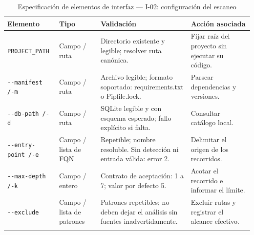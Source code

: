 \begin{table}[H]
\centering\small{}
\caption{Especificación de elementos de interfaz --- I-02: configuración del escaneo}
\begin{tabularx}{\textwidth}{P{3.0cm}P{2.3cm}YY}
\toprule
\textbf{Elemento} & \textbf{Tipo} & \textbf{Validación} & \textbf{Acción asociada} \\
\midrule
\texttt{PROJECT\_\allowbreak PATH} & Campo / ruta & Directorio existente y legible; resolver ruta canónica. & Fijar raíz del proyecto sin ejecutar su código. \\
\addlinespace
\texttt{-\allowbreak -\allowbreak manifest /\allowbreak  -\allowbreak m} & Campo / ruta & Archivo legible; formato soportado: requirements.txt o Pipfile.lock. & Parsear dependencias y versiones. \\
\addlinespace
\texttt{-\allowbreak -\allowbreak db-\allowbreak path /\allowbreak  -\allowbreak d} & Campo / ruta & SQLite legible y con esquema esperado; fallo explícito si falta. & Consultar catálogo local. \\
\addlinespace
\texttt{-\allowbreak -\allowbreak entry-\allowbreak point /\allowbreak  -\allowbreak e} & Campo / lista de FQN & Repetible; nombre resoluble. Sin detección ni entrada válida: error 2. & Delimitar el origen de los recorridos. \\
\addlinespace
\texttt{-\allowbreak -\allowbreak max-\allowbreak depth /\allowbreak  -\allowbreak k} & Campo / entero & Contrato de aceptación: 1 a 7; valor por defecto 5. & Acotar el recorrido e informar el límite. \\
\addlinespace
\texttt{-\allowbreak -\allowbreak exclude} & Campo / lista de patrones & Patrones repetibles; no deben dejar el análisis sin fuentes inadvertidamente. & Excluir rutas y registrar el alcance efectivo. \\
\addlinespace
\bottomrule
\end{tabularx}
\end{table}


